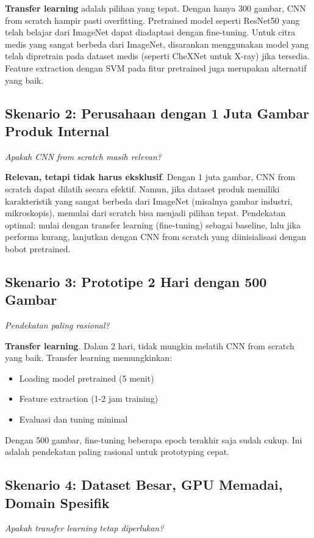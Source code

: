 \documentclass[conference]{IEEEtran}
\begin{document}
\textbf{Transfer learning} adalah pilihan yang tepat. Dengan hanya 300 gambar, CNN from scratch hampir pasti overfitting. Pretrained model seperti ResNet50 yang telah belajar dari ImageNet dapat diadaptasi dengan fine-tuning. Untuk citra medis yang sangat berbeda dari ImageNet, disarankan menggunakan model yang telah dipretrain pada dataset medis (seperti CheXNet untuk X-ray) jika tersedia. Feature extraction dengan SVM pada fitur pretrained juga merupakan alternatif yang baik.

\subsection{Skenario 2: Perusahaan dengan 1 Juta Gambar Produk Internal}
\textit{Apakah CNN from scratch masih relevan?}

\textbf{Relevan, tetapi tidak harus eksklusif}. Dengan 1 juta gambar, CNN from scratch dapat dilatih secara efektif. Namun, jika dataset produk memiliki karakteristik yang sangat berbeda dari ImageNet (misalnya gambar industri, mikroskopis), memulai dari scratch bisa menjadi pilihan tepat. Pendekatan optimal: mulai dengan transfer learning (fine-tuning) sebagai baseline, lalu jika performa kurang, lanjutkan dengan CNN from scratch yang diinisialisasi dengan bobot pretrained.

\subsection{Skenario 3: Prototipe 2 Hari dengan 500 Gambar}
\textit{Pendekatan paling rasional?}

\textbf{Transfer learning}. Dalam 2 hari, tidak mungkin melatih CNN from scratch yang baik. Transfer learning memungkinkan:
\begin{itemize}
	\item Loading model pretrained (5 menit)
	\item Feature extraction (1-2 jam training)
	\item Evaluasi dan tuning minimal
\end{itemize}
Dengan 500 gambar, fine-tuning beberapa epoch terakhir saja sudah cukup. Ini adalah pendekatan paling rasional untuk prototyping cepat.

\subsection{Skenario 4: Dataset Besar, GPU Memadai, Domain Spesifik}
\textit{Apakah transfer learning tetap diperlukan?}
\end{document}
